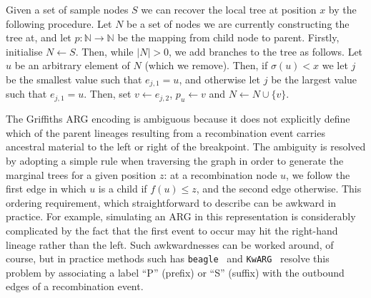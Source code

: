 \documentclass{article}
\begin{document}
Given a set of sample nodes $S$ we can recover the local tree at
position $x$ by the following procedure. Let $N$ be a set of
nodes we are currently constructing the tree at, and let
$p: \mathbb{N} \rightarrow \mathbb{N}$ be the mapping from child
node to parent. Firstly, initialise $N \leftarrow S$.
Then, while $|N| > 0$, we add branches to the
tree as follows. Let $u$ be an arbitrary element of $N$ (which
we remove). Then, if $\sigma(u) < x$ we let $j$ be the
smallest value such that $e_{j,1} = u$, and otherwise
let $j$ be the largest value such that $e_{j,1} = u$.
Then, set $v \leftarrow e_{j, 2}$,
$p_u \leftarrow v$
and $N \leftarrow N \cup \{v\}$.

The Griffiths ARG encoding is ambiguous because it does not explicitly
define which of the parent lineages resulting from a recombination
event carries ancestral material to the left or right of the
breakpoint. The ambiguity is resolved by adopting a simple rule when
traversing the graph in order to generate the marginal trees for a
given position $z$: at a recombination node $u$, we follow the
first edge in which $u$ is a child if $f(u) \leq z$, and the
second edge otherwise. This ordering requirement, which straightforward
to describe can be awkward in practice. For example,
simulating an ARG in this representation is considerably
complicated by the fact that the
first event to occur may hit the right-hand lineage rather
than the left.
Such awkwardnesses can be worked around, of course,
but in practice methods such has
\texttt{beagle}~\citep{lyngso2005minimum} and
\texttt{KwARG}~\citep{ignatieva2021kwarg}
resolve this problem by
associating a label ``P'' (prefix) or ``S'' (suffix) with the
outbound edges of a recombination event.
\end{document}
